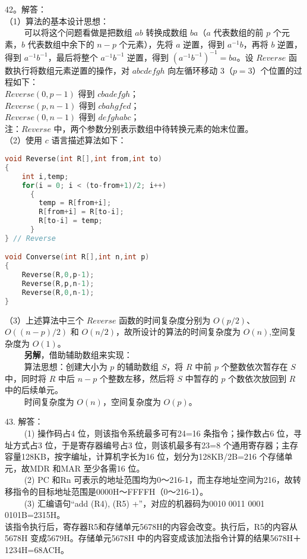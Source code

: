 42。解答：\\
（1）算法的基本设计思想：\\
$\qquad$ 可以将这个问题看做是把数组 $ab$ 转换成数组 $ba$（$a$ 代表数组的前 $p$ 个元素，$b$ 代表数组中余下的 $n-p$ 个元素），先将 $a$ 逆置，得到 $a^{-1}b$，再将 $b$ 逆置，得到 $a^{-1}b^{-1}$，最后将整个 $a^{-1}b^{-1}$ 逆置，得到 $(a^{-1}b^{-1})^{-1}=ba$。设 $Reverse$ 函数执行将数组元素逆置的操作，对 $abcdefgh$ 向左循环移动 $3$（$p=3$）个位置的过程如下：\\
$Reverse(0,p-1)$ 得到 $cbadefgh$； \\
$Reverse(p,n-1)$ 得到 $cbahgfed$； \\
$Reverse(0,n-1)$ 得到 $defghabc$； \\
注：$Reverse$ 中，两个参数分别表示数组中待转换元素的始末位置。 \\
（2）使用 $c$ 语言描述算法如下：
\begin{lstlisting}[language=cpp]
void Reverse(int R[],int from,int to)
{
    int i,temp;
    for(i = 0; i < (to-from+1)/2; i++)
      {
        temp = R[from+i];
        R[from+i] = R[to-i];
        R[to-i] = temp;
      }
} // Reverse

void Converse(int R[],int n,int p)
{
    Reverse(R,0,p-1);
    Reverse(R,p,n-1);
    Reverse(R,0,n-1);
}
\end{lstlisting}
（3）上述算法中三个 $Reverse$ 函数的时间复杂度分别为 $O(p/2)$、$O((n-p)/2)$ 和 $O(n/2)$，故所设计的算法的时间复杂度为 $O(n)$,空间复杂度为 $O(1)$。\\
$\qquad$ \textbf{另解}，借助辅助数组来实现：\\
$\qquad$ 算法思想：创建大小为 $p$ 的辅助数组 $S$，将 $R$ 中前 $p$ 个整数依次暂存在 $S$ 中，同时将 $R$ 中后 $n-p$ 个整数左移，然后将 $S$ 中暂存的 $p$ 个数依次放回到 $R$ 中的后续单元。\\
$\qquad$ 时间复杂度为 $O(n)$，空间复杂度为 $O(p)$。

43. 解答：\\
$\qquad$ (1) 操作码占4 位，则该指令系统最多可有24=16 条指令；操作数占6 位，寻址方式占3 位，于是寄存器编号占3 位，则该机最多有23=8 个通用寄存器；主存容量128KB，按字编址，计算机字长为16 位，划分为128KB/2B=216 个存储单元，故MDR 和MAR 至少各需16 位。\\
$\qquad$ (2) PC 和Rn 可表示的地址范围均为0～216-1，而主存地址空间为216，故转移指令的目标地址范围是0000H～FFFFH（0～216-1）。\\
$\qquad$ (3) 汇编语句“add (R4), (R5) +”，对应的机器码为0010 0011 0001 0101B=2315H。\\
该指令执行后，寄存器R5和存储单元5678H的内容会改变。执行后，R5的内容从5678H 变成5679H。存储单元5678H 中的内容变成该加法指令计算的结果5678H＋1234H=68ACH。

